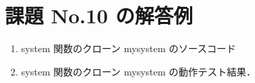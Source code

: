 \documentclass[a4j,twcolumn,11pt,nomag]{ltjarticle}      %
\begin{document}
\onecolumn

\section*{課題 No.10 の解答例}
\begin{enumerate}
\item system 関数のクローン mysystem のソースコード
\newpage
\item system 関数のクローン mysystem の動作テスト結果．
\end{enumerate}
\end{document}
